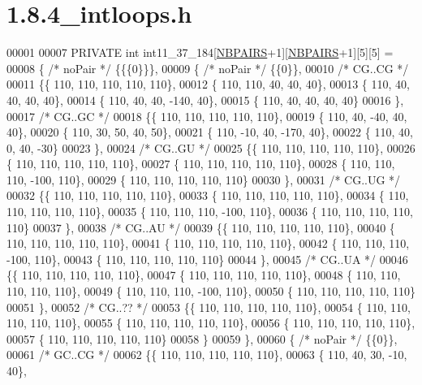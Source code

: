 \hypertarget{1_88_84__intloops_8h_source}{}\section{1.8.4\+\_\+intloops.h}
\label{1_88_84__intloops_8h_source}

\begin{DoxyCode}
00001 
00007 PRIVATE \textcolor{keywordtype}{int} int11\_37\_184[\hyperlink{constants_8h_a5e75221c779d618eab81e096f37e32ce}{NBPAIRS}+1][\hyperlink{constants_8h_a5e75221c779d618eab81e096f37e32ce}{NBPAIRS}+1][5][5] =
00008 \{ \textcolor{comment}{/* noPair */} \{\{\{0\}\}\},
00009 \{ \textcolor{comment}{/* noPair */} \{\{0\}\},
00010 \textcolor{comment}{/* CG..CG */}
00011 \{\{ 110, 110, 110, 110, 110\},
00012 \{ 110, 110,  40,  40,  40\},
00013 \{ 110,  40,  40,  40,  40\},
00014 \{ 110,  40,  40, -140,  40\},
00015 \{ 110,  40,  40,  40,  40\}
00016 \},
00017 \textcolor{comment}{/* CG..GC */}
00018 \{\{ 110, 110, 110, 110, 110\},
00019 \{ 110,  40, -40,  40,  40\},
00020 \{ 110,  30,  50,  40,  50\},
00021 \{ 110, -10,  40, -170,  40\},
00022 \{ 110,  40,   0,  40, -30\}
00023 \},
00024 \textcolor{comment}{/* CG..GU */}
00025 \{\{ 110, 110, 110, 110, 110\},
00026 \{ 110, 110, 110, 110, 110\},
00027 \{ 110, 110, 110, 110, 110\},
00028 \{ 110, 110, 110, -100, 110\},
00029 \{ 110, 110, 110, 110, 110\}
00030 \},
00031 \textcolor{comment}{/* CG..UG */}
00032 \{\{ 110, 110, 110, 110, 110\},
00033 \{ 110, 110, 110, 110, 110\},
00034 \{ 110, 110, 110, 110, 110\},
00035 \{ 110, 110, 110, -100, 110\},
00036 \{ 110, 110, 110, 110, 110\}
00037 \},
00038 \textcolor{comment}{/* CG..AU */}
00039 \{\{ 110, 110, 110, 110, 110\},
00040 \{ 110, 110, 110, 110, 110\},
00041 \{ 110, 110, 110, 110, 110\},
00042 \{ 110, 110, 110, -100, 110\},
00043 \{ 110, 110, 110, 110, 110\}
00044 \},
00045 \textcolor{comment}{/* CG..UA */}
00046 \{\{ 110, 110, 110, 110, 110\},
00047 \{ 110, 110, 110, 110, 110\},
00048 \{ 110, 110, 110, 110, 110\},
00049 \{ 110, 110, 110, -100, 110\},
00050 \{ 110, 110, 110, 110, 110\}
00051 \},
00052 \textcolor{comment}{/* CG..?? */}
00053 \{\{ 110, 110, 110, 110, 110\},
00054 \{ 110, 110, 110, 110, 110\},
00055 \{ 110, 110, 110, 110, 110\},
00056 \{ 110, 110, 110, 110, 110\},
00057 \{ 110, 110, 110, 110, 110\}
00058 \}
00059 \},
00060 \{ \textcolor{comment}{/* noPair */} \{\{0\}\},
00061 \textcolor{comment}{/* GC..CG */}
00062 \{\{ 110, 110, 110, 110, 110\},
00063 \{ 110,  40,  30, -10,  40\},

\end{DoxyCode}
